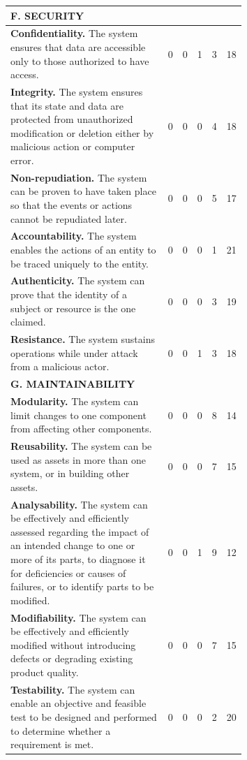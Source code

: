 \begin{longtable}{p{0.67\linewidth} c c c c c}
\multicolumn{6}{l}{\textbf{F. SECURITY}} \\
\midrule
\textbf{Confidentiality.} The system ensures that data are accessible only to those authorized to have access. & 0 & 0 & 1 & 3 & 18 \\
\textbf{Integrity.} The system ensures that its state and data are protected from unauthorized modification or deletion either by malicious action or computer error. & 0 & 0 & 0 & 4 & 18 \\
\textbf{Non-repudiation.} The system can be proven to have taken place so that the events or actions cannot be repudiated later. & 0 & 0 & 0 & 5 & 17 \\
\textbf{Accountability.} The system enables the actions of an entity to be traced uniquely to the entity. & 0 & 0 & 0 & 1 & 21 \\
\textbf{Authenticity.} The system can prove that the identity of a subject or resource is the one claimed. & 0 & 0 & 0 & 3 & 19 \\
\textbf{Resistance.} The system sustains operations while under attack from a malicious actor. & 0 & 0 & 1 & 3 & 18 \\
\midrule

\multicolumn{6}{l}{\textbf{G. MAINTAINABILITY}} \\
\midrule
\textbf{Modularity.} The system can limit changes to one component from affecting other components. & 0 & 0 & 0 & 8 & 14 \\
\textbf{Reusability.} The system can be used as assets in more than one system, or in building other assets. & 0 & 0 & 0 & 7 & 15 \\
\textbf{Analysability.} The system can be effectively and efficiently assessed regarding the impact of an intended change to one or more of its parts, to diagnose it for deficiencies or causes of failures, or to identify parts to be modified. & 0 & 0 & 1 & 9 & 12 \\
\textbf{Modifiability.} The system can be effectively and efficiently modified without introducing defects or degrading existing product quality. & 0 & 0 & 0 & 7 & 15 \\
\textbf{Testability.} The system can enable an objective and feasible test to be designed and performed to determine whether a requirement is met. & 0 & 0 & 0 & 2 & 20 \\
\midrule


\end{longtable}

